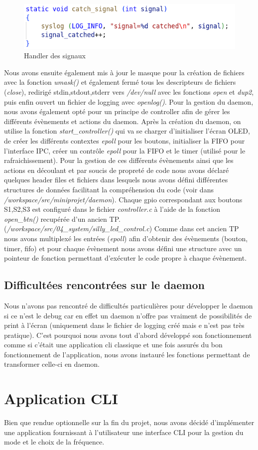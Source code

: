 \documentclass{ReportTemplate}
\begin{document}
\begin{figure}[H]
    \centering
    \includegraphics[width=\textwidth]{imageSources/catch_signal.png}
    \caption{Handler des signaux}
    \label{fig:CatchSignal}
\end{figure}
\newpage
Nous avons ensuite également mis à jour le masque pour la création de fichiers
avec la fonction \textit{umask()} et également fermé tous les descripteurs de
fichiers (\textit{close}), redirigé stdin,stdout,stderr vers \textit{/dev/null}
avec les fonctions \textit{open} et \textit{dup2}, puis enfin ouvert un fichier
de logging avec \textit{openlog()}.\newline
Pour la gestion du daemon, nous avons également opté pour un principe de
controller afin de gérer les différents évènements et actions du daemon. Après
la création du daemon, on utilise la fonction \textit{start\_controller()} qui va
se charger d'initialiser l'écran OLED, de créer les différents contextes
\textit{epoll} pour les boutons, initialiser la FIFO pour l'interface IPC, créer
un contrôle \textit{epoll} pour la FIFO et le timer (utilisé pour le
rafraichissement).\newline
Pour la gestion de ces différents évènements ainsi que les actions en découlant
et par soucis de propreté de code nous avons déclaré quelques header files et
fichiers dans lesquels nous avons défini différentes structures de données
facilitant la compréhension du code (voir dans
\textit{/workspace/src/miniprojet/daemon}).\newline
Chaque gpio correspondant aux boutons S1,S2,S3 est configuré dans le fichier
\textit{controller.c} à l'aide de la fonction \textit{open\_btn()} recupérée
d'un ancien TP. (\textit{/workspace/src/04\_system/silly\_led\_control.c}) Comme
dans cet ancien TP nous avons multiplexé les entrées (\textit{epoll}) afin
d'obtenir des évènements (bouton, timer, fifo) et pour chaque évènement nous
avons défini une structure avec un pointeur de fonction permettant d'exécuter le
code propre à chaque évènement.\newline
\section{Difficultées rencontrées sur le daemon}
Nous n'avons pas rencontré de difficultés particulières pour développer le
daemon si ce n'est le debug car en effet un daemon n'offre pas vraiment de
possibilités de print à l'écran (uniquement dans le fichier de logging créé mais
e n'est pas très pratique). C'est pourquoi nous avons tout d'abord développé son
fonctionnement comme si c'était une application cli classique et une fois
assurés du bon fonctionnement de l'application, nous avons instauré les
fonctions permettant de transformer celle-ci en daemon.\newline


\chapter{Application CLI}
Bien que rendue optionnelle sur la fin du projet, nous avons décidé
d'implémenter une application fournissant à l'utilisateur une interface CLI pour
la gestion du mode et le choix de la fréquence.\newline
\end{document}
